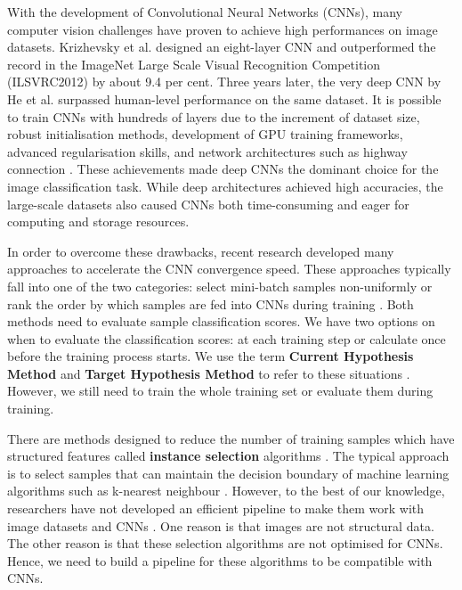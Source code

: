 With the development of Convolutional Neural Networks (CNNs), many computer vision challenges have proven to achieve high performances on image datasets. Krizhevsky et al. \cite{Krizhevsky2017} designed an eight-layer CNN and outperformed the record in the ImageNet Large Scale Visual Recognition Competition (ILSVRC2012) by about 9.4 per cent. Three years later, the very deep CNN by He et al. \cite{He, He2016} surpassed human-level performance on the same dataset. It is possible to train CNNs with hundreds of layers due to the increment of dataset size, robust initialisation methods, development of GPU training frameworks, advanced regularisation skills, and network architectures such as highway connection \cite{He2016, Huang2017}. These achievements made deep CNNs the dominant choice for the image classification task. While deep architectures achieved high accuracies, the large-scale datasets also caused CNNs both time-consuming and eager for computing and storage resources. 

In order to overcome these drawbacks, recent research developed many approaches to accelerate the CNN convergence speed. These approaches typically fall into one of the two categories: select mini-batch samples non-uniformly \cite{Shrivastava2016, Li2017, Katharopoulos2017, Chang2017} or rank the order by which samples are fed into CNNs during training \cite{Bengio2009, Hacohen2019a}. Both methods need to evaluate sample classification scores. We have two options on when to evaluate the classification scores: at each training step or calculate once before the training process starts. We use the term \textbf{Current Hypothesis Method} and \textbf{Target Hypothesis Method} to refer to these situations \cite{Hacohen2019a}. However, we still need to train the whole training set or evaluate them during training. 

There are methods designed to reduce the number of training samples which have structured features called \textbf{instance selection} algorithms \cite{Olvera-Lopez2010, Aha1991, Brighton2002, Riquelme2003a}. The typical approach is to select samples that can maintain the decision boundary of machine learning algorithms such as k-nearest neighbour \cite{Malhat2020}. However, to the best of our knowledge, researchers have not developed an efficient pipeline to make them work with image datasets and CNNs \cite{Sun2014, Albelwi2016}. One reason is that images are not structural data. The other reason is that these selection algorithms are not optimised for CNNs. Hence, we need to build a pipeline for these algorithms to be compatible with CNNs.

